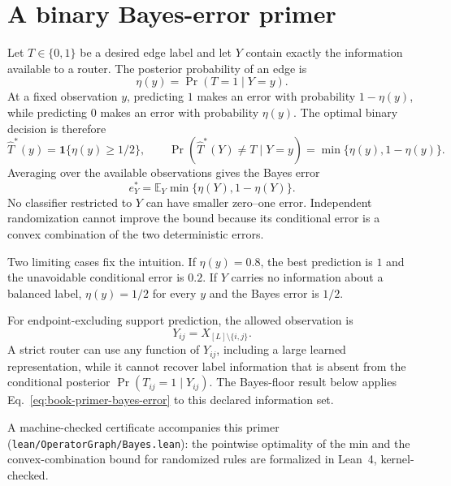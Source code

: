 \section{A binary Bayes-error primer}
\label{sec:book-bayes-error-primer}

Let $T\in\{0,1\}$ be a desired edge label and let $Y$ contain exactly the information available to
a router.  The posterior probability of an edge is
\begin{equation}
\eta(y)=\Pr(T=1\mid Y=y).
\label{eq:book-primer-binary-posterior}
\end{equation}
At a fixed observation $y$, predicting $1$ makes an error with probability $1-\eta(y)$, while
predicting $0$ makes an error with probability $\eta(y)$.  The optimal binary decision is therefore
\begin{equation}
\widehat T^*(y)=\mathbf1\{\eta(y)\geq1/2\},
\qquad
\Pr(\widehat T^*(Y)\ne T\mid Y=y)
=\min\{\eta(y),1-\eta(y)\}.
\label{eq:book-primer-binary-decision}
\end{equation}
Averaging over the available observations gives the Bayes error
\begin{equation}
e_Y^*
=\mathbb E_Y\min\{\eta(Y),1-\eta(Y)\}.
\label{eq:book-primer-bayes-error}
\end{equation}
No classifier restricted to $Y$ can have smaller zero--one error.  Independent randomization cannot
improve the bound because its conditional error is a convex combination of the two deterministic
errors.

Two limiting cases fix the intuition.  If $\eta(y)=0.8$, the best prediction is $1$ and the
unavoidable conditional error is $0.2$.  If $Y$ carries no information about a balanced label,
$\eta(y)=1/2$ for every $y$ and the Bayes error is $1/2$.

For endpoint-excluding support prediction, the allowed observation is
\begin{equation}
Y_{ij}=X_{[L]\setminus\{i,j\}}.
\label{eq:book-primer-endpoint-excluding-observation}
\end{equation}
A strict router can use any function of $Y_{ij}$, including a large learned representation, while
it cannot recover label information that is absent from the conditional posterior
$\Pr(T_{ij}=1\mid Y_{ij})$.  The Bayes-floor result below applies
Eq.~\ref{eq:book-primer-bayes-error} to this declared information set.

A machine-checked certificate accompanies this primer
(\texttt{lean/OperatorGraph/Bayes.lean}): the pointwise optimality of the
min and the convex-combination bound for randomized rules are formalized in
Lean~4, kernel-checked.
